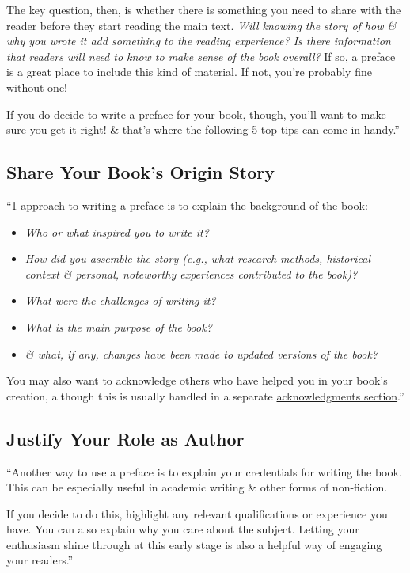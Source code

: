 \documentclass[oneside]{book}
\numberwithin{equation}{section}
\begin{document}
The key question, then, is whether there is something you need to share with the reader before they start reading the main text. \textit{Will knowing the story of how \& why you wrote it add something to the reading experience? Is there information that readers will need to know to make sense of the book overall?} If so, a preface is a great place to include this kind of material. If not, you're probably fine without one!

If you do decide to write a preface for your book, though, you'll want to make sure you get it right! \& that's where the following 5 top tips can come in handy.''

\subsection{Share Your Book's Origin Story}
``1 approach to writing a preface is to explain the background of the book:
\begin{itemize}
	\item \textit{Who or what inspired you to write it?}
	\item \textit{How did you assemble the story (e.g., what research methods, historical context \& personal, noteworthy experiences contributed to the book)?}
	\item \textit{What were the challenges of writing it?}
	\item \textit{What is the main purpose of the book?}
	\item \textit{\& what, if any, changes have been made to updated versions of the book?}
\end{itemize}
You may also want to acknowledge others who have helped you in your book's creation, although this is usually handled in a separate \href{https://www.linkedin.com/pulse/write-your-book-acknowledgments-without-stressing-over-tucker-max/}{acknowledgments section}.''

\subsection{Justify Your Role as Author}
``Another way to use a preface is to explain your credentials for writing the book. This can be especially useful in academic writing \& other forms of non-fiction.

If you decide to do this, highlight any relevant qualifications or experience you have. You can also explain why you care about the subject. Letting your enthusiasm shine through at this early stage is also a helpful way of engaging your readers.''
\end{document}
